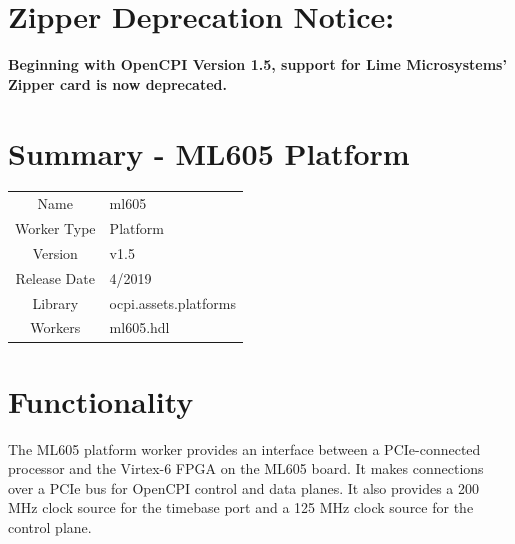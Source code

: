 \documentclass{article}
\author{} %
\date{Version \docVersion} %
\title{\docTitle}
\def\docVersion{1.5}
\def\comp{ml605}
\def\Comp{ML605 Platform}
\begin{document}
\section*{Zipper Deprecation Notice:}
\textbf{Beginning with OpenCPI Version 1.5, support for Lime Microsystems' Zipper card is now deprecated.}


\section*{Summary - \Comp}
\begin{tabular}{|c|M{13.5cm}|}
	\hline
	                  & \\
	\hline
	Name              & \comp \\
	\hline
	Worker Type       & Platform \\
	\hline
	Version           & v\docVersion \\
	\hline
	Release Date      & 4/2019 \\
	\hline
	Library & ocpi.assets.platforms \\
	\hline
	Workers & \comp.hdl \\
	\hline
\end{tabular}

\section*{Functionality}
\begin{flushleft}
	The ML605 platform worker provides an interface between a PCIe-connected processor and the Virtex-6 FPGA on the ML605 board. It makes connections over a PCIe bus for OpenCPI control and data planes. It also provides a 200 MHz clock source for the timebase port and a 125 MHz clock source for the control plane.
\end{flushleft}
\end{document}

